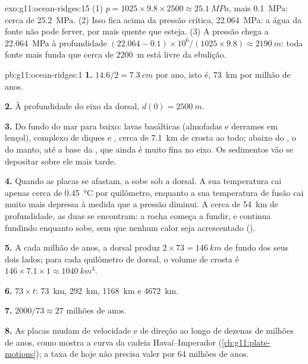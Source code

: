 \begin{solution}{exo:g11:ocean-ridges:15}
(1) $p = 1025 \times 9.8 \times 2500 \approx \qty{25.1}{MPa}$, mais
\qty{0.1}{MPa}: cerca de \qty{25.2}{MPa}. (2) Isso fica acima da pressão
crítica, \qty{22.064}{MPa}: a água da fonte não pode ferver, por mais quente
que esteja. (3) A pressão chega a \qty{22.064}{MPa} à profundidade
$(22.064 - 0.1) \times 10^6/(1025 \times 9.8) \approx \qty{2190}{m}$: toda
fonte mais funda que cerca de \qty{2200}{m} está livre da ebulição.
\end{solution}

\begin{solution}{pb:g11:ocean-ridges:1}
\textbf{1.} $14.6/2 = \qty{7.3}{cm}$ por ano, isto é, \qty{73}{km} por
milhão de anos.

\textbf{2.} À profundidade do eixo da dorsal, $d(0) = \qty{2500}{m}$.

\textbf{3.} Do fundo do mar para baixo: lavas basálticas (almofadas e
derrames em lençol), complexo de diques e , cerca de \qty{7.1}{km} de
crosta ao todo; abaixo do , o  do manto, até a base da
, que ainda é muito fina no eixo. Os sedimentos vão se depositar
sobre ele mais tarde.

\textbf{4.} Quando as placas se afastam, a  sobe sob a dorsal. A
sua temperatura cai apenas cerca de \qty{0.45}{\celsius} por quilômetro,
enquanto a sua temperatura de fusão cai muito mais depressa à medida que a
pressão diminui. A cerca de \qty{54}{km} de profundidade, as duas se
encontram: a rocha começa a fundir, e continua fundindo enquanto sobe, sem
que nenhum calor seja acrescentado ().

\textbf{5.} A cada milhão de anos, a dorsal produz $2 \times 73 = \qty{146}{km}$
de fundo dos seus dois lados; para cada quilômetro de dorsal, o volume de
crosta é $146 \times 7.1 \times 1 \approx \qty{1040}{km^3}$.

\textbf{6.} $73 \times t$: \qty{73}{km}, \qty{292}{km}, \qty{1168}{km} e
\qty{4672}{km}.

\textbf{7.} $2000/73 \approx 27$ milhões de anos.

\textbf{8.} As placas mudam de velocidade e de direção ao longo de dezenas de
milhões de anos, como mostra a curva da cadeia Havaí--Imperador
(\cref{ch:g11:plate-motions}); a taxa de hoje não precisa valer por 64
milhões de anos.


\end{solution}
